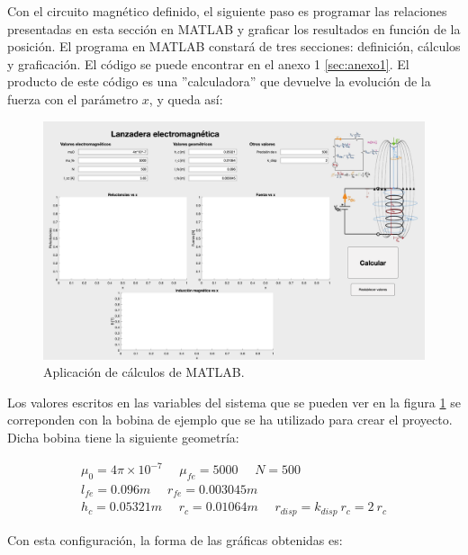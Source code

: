 Con el circuito magnético definido, el siguiente paso es programar las relaciones presentadas en esta sección en MATLAB y graficar los resultados en función de la posición. El programa en MATLAB constará de tres secciones: definición, cálculos y graficación. El código se puede encontrar en el anexo 1 \ref{sec:anexo1}. El producto de este código es una ''calculadora'' que devuelve la evolución de la fuerza con el parámetro \(x\), y queda así:

\begin{figure}[H]
    \centering
    \includegraphics[width=13cm]{FigurasMemoria/calculadora.png}
    \caption{Aplicación de cálculos de MATLAB.}
    \label{fig:calculadora} %
\end{figure}

Los valores escritos en las variables del sistema que se pueden ver en la figura \ref{fig:calculadora} se correponden con la bobina de ejemplo que se ha utilizado para crear el proyecto. Dicha bobina tiene la siguiente geometría:

\[
\begin{array}{c}
    \mu_0 = 4\pi \times 10^{-7}~~~~~~\mu_{fe} = 5000~~~~~~N = 500 \\
    l_{fe} = 0.096m~~~~~~r_{fe} = 0.003045m \\
    h_c = 0.05321m~~~~~~r_{c} = 0.01064m~~~~~~r_{disp} = k_{disp}~r_{c}=2~r_{c}
\end{array}
\]

Con esta configuración, la forma de las gráficas obtenidas es:


